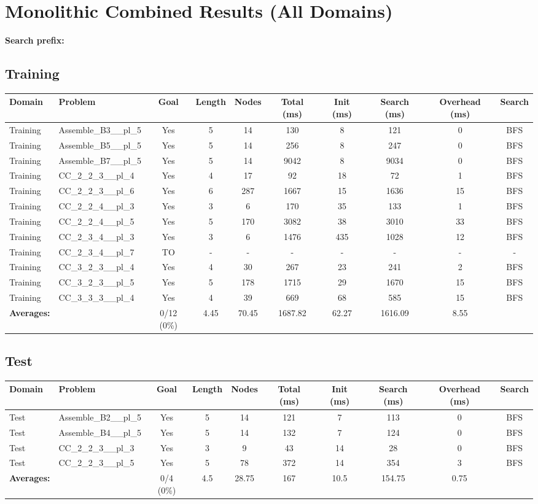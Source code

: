 \documentclass{article}
\begin{document}
\section*{Monolithic Combined Results (All Domains)}
\textbf{Search prefix:} 
\\[0.5cm]
\subsection*{Training}
\begin{tabular}{llcccccccc}
\toprule
Domain & Problem & Goal & Length & Nodes & Total (ms) & Init (ms) & Search (ms) & Overhead (ms) & Search \\
\midrule
Training & Assemble\_B3\_\_pl\_5 & Yes & 5 & 14 & 130 & 8 & 121 & 0 & BFS \\
Training & Assemble\_B5\_\_pl\_5 & Yes & 5 & 14 & 256 & 8 & 247 & 0 & BFS \\
Training & Assemble\_B7\_\_pl\_5 & Yes & 5 & 14 & 9042 & 8 & 9034 & 0 & BFS \\
Training & CC\_2\_2\_3\_\_pl\_4 & Yes & 4 & 17 & 92 & 18 & 72 & 1 & BFS \\
Training & CC\_2\_2\_3\_\_pl\_6 & Yes & 6 & 287 & 1667 & 15 & 1636 & 15 & BFS \\
Training & CC\_2\_2\_4\_\_pl\_3 & Yes & 3 & 6 & 170 & 35 & 133 & 1 & BFS \\
Training & CC\_2\_2\_4\_\_pl\_5 & Yes & 5 & 170 & 3082 & 38 & 3010 & 33 & BFS \\
Training & CC\_2\_3\_4\_\_pl\_3 & Yes & 3 & 6 & 1476 & 435 & 1028 & 12 & BFS \\
Training & CC\_2\_3\_4\_\_pl\_7 & TO & - & - & - & - & - & - & - \\
Training & CC\_3\_2\_3\_\_pl\_4 & Yes & 4 & 30 & 267 & 23 & 241 & 2 & BFS \\
Training & CC\_3\_2\_3\_\_pl\_5 & Yes & 5 & 178 & 1715 & 29 & 1670 & 15 & BFS \\
Training & CC\_3\_3\_3\_\_pl\_4 & Yes & 4 & 39 & 669 & 68 & 585 & 15 & BFS \\
\textbf{Averages:} & & 0/12 (0\%) & 4.45 & 70.45 & 1687.82 & 62.27 & 1616.09 & 8.55 & \\
\bottomrule
\end{tabular}
\newpage
\subsection*{Test}
\begin{tabular}{llcccccccc}
\toprule
Domain & Problem & Goal & Length & Nodes & Total (ms) & Init (ms) & Search (ms) & Overhead (ms) & Search \\
\midrule
Test & Assemble\_B2\_\_pl\_5 & Yes & 5 & 14 & 121 & 7 & 113 & 0 & BFS \\
Test & Assemble\_B4\_\_pl\_5 & Yes & 5 & 14 & 132 & 7 & 124 & 0 & BFS \\
Test & CC\_2\_2\_3\_\_pl\_3 & Yes & 3 & 9 & 43 & 14 & 28 & 0 & BFS \\
Test & CC\_2\_2\_3\_\_pl\_5 & Yes & 5 & 78 & 372 & 14 & 354 & 3 & BFS \\
\textbf{Averages:} & & 0/4 (0\%) & 4.5 & 28.75 & 167 & 10.5 & 154.75 & 0.75 & \\
\bottomrule
\end{tabular}
\newpage
\end{document}
